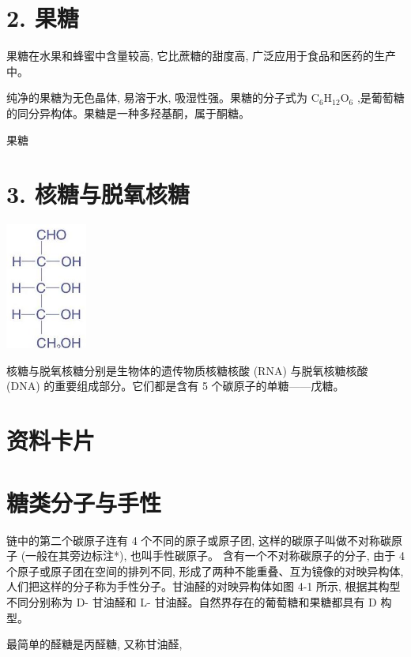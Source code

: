 \documentclass[10pt]{article}
\begin{document}
\section*{2. 果糖}

果糖在水果和蜂蜜中含量较高, 它比蔗糖的甜度高, 广泛应用于食品和医药的生产中。

纯净的果糖为无色晶体, 易溶于水, 吸湿性强。果糖的分子式为 \({\mathrm{C}}_{6}{\mathrm{H}}_{12}{\mathrm{O}}_{6}\) ,是葡萄糖的同分异构体。果糖是一种多羟基酮，属于酮糖。

果糖

\section*{3. 核糖与脱氧核糖}

\begin{center}
\includegraphics[max width=0.2\textwidth]{images/0190efc5-b58a-7c43-bfb0-e0a030df9cfd_109_650718.jpg}
\end{center}

核糖与脱氧核糖分别是生物体的遗传物质核糖核酸 (RNA) 与脱氧核糖核酸 (DNA) 的重要组成部分。它们都是含有 5 个碳原子的单糖——戊糖。

\section*{资料卡片}

\section*{糖类分子与手性}

链中的第二个碳原子连有 4 个不同的原子或原子团, 这样的碳原子叫做不对称碳原子 (一般在其旁边标注*), 也叫手性碳原子。 含有一个不对称碳原子的分子, 由于 4 个原子或原子团在空间的排列不同, 形成了两种不能重叠、互为镜像的对映异构体, 人们把这样的分子称为手性分子。甘油醛的对映异构体如图 4-1 所示, 根据其构型不同分别称为 D- 甘油醛和 L- 甘油醛。自然界存在的葡萄糖和果糖都具有 \(\mathrm{D}\) 构型。

最简单的醛糖是丙醛糖, 又称甘油醛,
\end{document}
